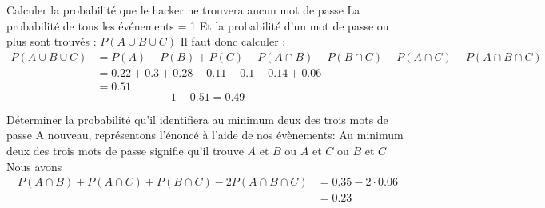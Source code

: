 \begin{exo}
\begin{subexo}{Calculer la probabilité que le hacker ne trouvera aucun mot de passe}
        La probabilité de tous les événements = 1\newline
        Et la probabilité d'un mot de passe ou plus sont trouvés : $P(A\cup B \cup C)$
        \newline Il faut donc calculer :
        \begin{align*}
            P(A\cup B \cup C) &= P(A) + P(B) + P(C) - P(A\cap B) - P(B\cap C) - P(A\cap C) + P(A\cap B \cap C)\\
            &= 0.22 + 0.3 + 0.28 - 0.11 -0.1 - 0.14 + 0.06\\
            &= 0.51
        \end{align*}
        $$ 1- 0.51 = 0.49 $$
    \end{subexo}
    \begin{subexo}{Déterminer la probabilité qu'il identifiera au minimum deux des trois mots de passe}
        A nouveau, représentons l'énoncé à l'aide de nos évènements:
        Au minimum deux des trois mots de passe signifie qu'il trouve $A\text{ et } B $ ou $A$ et $C$ ou $B$ et $C$
        Nous avons \begin{align*}
            P(A\cap B) + P(A\cap C) + P(B \cap C) - 2P(A\cap B \cap C) &= 0.35-2\cdot 0.06\\
            &= 0.23
        \end{align*}
    \end{subexo}
\end{exo}
